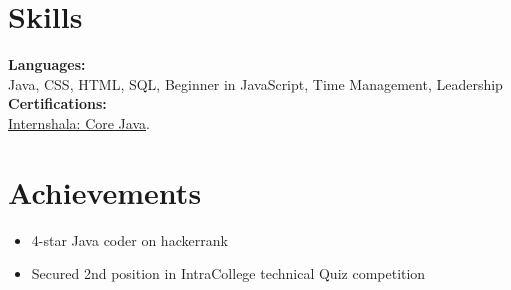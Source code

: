 \documentclass[a4paper,8pt]{article}
\begin{document}
\section{Skills}
\color[HTML]{1C033C}\textbf{Languages:} \\[2pt]
\color[HTML]{371e77} \hspace*{4ex} Java, CSS, HTML, SQL, Beginner in JavaScript, Time Management, Leadership\\[3pt]
\color[HTML]{1C033C}\textbf{Certifications:} \\[2pt]
\color[HTML]{371e77} \hspace*{4ex} \uline{\href{https://trainings.internshala.com/verify-certificate/?certificate_number=cnzk0h47ptr}{Internshala: Core Java}}.


\section{Achievements}
\begin{minipage}[t]{\linewidth}
    \begin{itemize}[nosep,after=\strut, leftmargin=2em, itemsep=2pt]
        \item 4-star Java coder on hackerrank
        \item Secured 2nd position in IntraCollege technical Quiz competition
    \end{itemize}
    \end{minipage}
\end{document}
